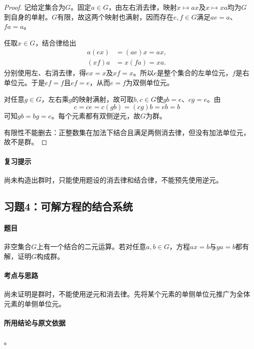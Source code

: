
\begin{proof}
记给定集合为$G$。固定$a\in G$，由左右消去律，映射$x\mapsto ax$及$x\mapsto xa$均为$G$到自身的单射。$G$有限，故这两个映射也满射，因而存在$e,f\in G$满足$ae=a$、$fa=a$。

任取$x\in G$，结合律给出
\begin{align*}
a(ex)&=(ae)x=ax,\\
(xf)a&=x(fa)=xa.
\end{align*}
分别使用左、右消去律，得$ex=x$及$xf=x$。所以$e$是整个集合的左单位元，$f$是右单位元。于是$ef=f$且$ef=e$，从而$e=f$为双侧单位元。

对任意$g\in G$，左右乘$g$的映射满射，故可取$b,c\in G$使$gb=e$、$cg=e$。由
\[
c=ce=c(gb)=(cg)b=eb=b
\]
可知$gb=bg=e$。每个元素都有双侧逆元，故$G$为群。

有限性不能删去：正整数集在加法下结合且满足两侧消去律，但没有加法单位元，故不是群。
\end{proof}

\paragraph{复习提示}
尚未构造出群时，只能使用题设的消去律和结合律，不能预先使用逆元。


\subsection{习题4：\texorpdfstring{可解方程的结合系统}{可解方程的结合系统}}
\label{ex:1:4}

\paragraph{题目}
非空集合$G$上有一个结合的二元运算。若对任意$a,b\in G$，方程$ax=b$与$ya=b$都有解，证明$G$构成群。

\paragraph{考点与思路}
尚未证明是群时，不能使用逆元和消去律。先将某个元素的单侧单位元推广为全体元素的单侧单位元。

\paragraph{所用结论与原文依据}
。


